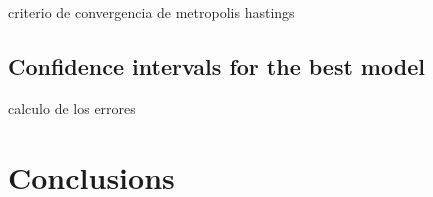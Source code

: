 \documentclass{aa}
\begin{document}
criterio de convergencia de metropolis hastings

\subsection{Confidence intervals for the best model} \label{S_}

calculo de los errores





\section{Conclusions} \label{S_conclusus} 
 




\footnotesize{
  
  
}
\end{document}
